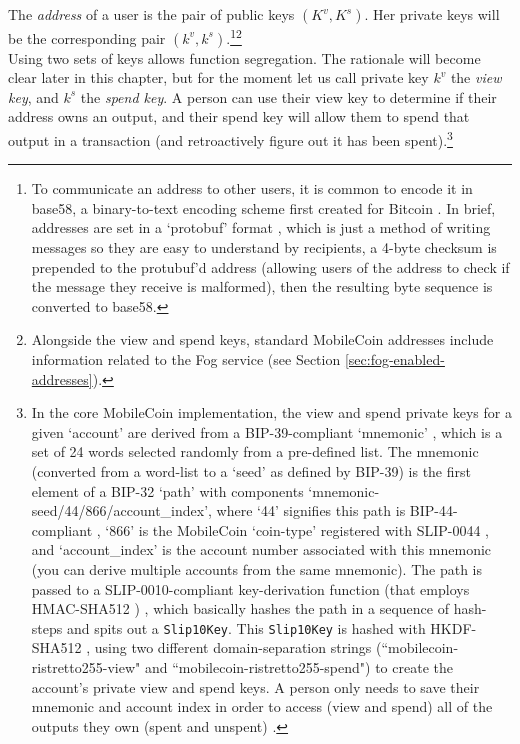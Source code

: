 The {\em address} of a user is the pair of public keys \((K^v, K^s)\). Her private keys will be the corresponding pair \( (k^v, k^s) \).\footnote{To communicate an address to other users, it is common to encode it in base58, a binary-to-text encoding scheme first created for Bitcoin \cite{base-58-encoding}. In brief, addresses are set in a `protobuf' format \cite{protubuf-encoding}, which is just a method of writing messages so they are easy to understand by recipients, a 4-byte checksum is prepended to the protubuf'd address (allowing users of the address to check if the message they receive is malformed), then the resulting byte sequence is converted to base58.}\footnote{Alongside the view and spend keys, standard MobileCoin addresses include information related to the Fog service (see Section \ref{sec:fog-enabled-addresses}).}
\\

Using two sets of keys allows function segregation. The rationale will become clear later in this chapter, but for the moment let us call private key $k^v$ the {\em view key}, and $k^s$ the {\em spend key}. A person can use their view key to determine if their address owns an output, and their spend key will allow them to spend that output in a transaction (and retroactively figure out it has been spent).\footnote{In the core MobileCoin implementation, the view and spend private keys for a given `account' are derived from a BIP-39-compliant `mnemonic' \cite{bip-39}, which is a set of 24 words selected randomly from a pre-defined list. The mnemonic (converted from a word-list to a `seed' \cite{tiny-bip39-lib} as defined by BIP-39) is the first element of a BIP-32 `path' \cite{bip-32} with components `mnemonic-seed/44/866/account\_index', where `44' signifies this path is BIP-44-compliant \cite{bip-44}, `866' is the MobileCoin `coin-type' registered with SLIP-0044 \cite{slip-44}, and `account\_index' is the account number associated with this mnemonic (you can derive multiple accounts from the same mnemonic). The path is passed to a SLIP-0010-compliant \cite{slip-10} key-derivation function (that employs HMAC-SHA512 \cite{hmac-rfc2104}) \cite{slip10-ed25519-lib}, which basically hashes the path in a sequence of hash-steps and spits out a {\tt Slip10Key}. This {\tt Slip10Key} is hashed with HKDF-SHA512 \cite{kdfs-rust-lib, hkdf-rfc5869}, using two different domain-separation strings (``mobilecoin-ristretto255-view" and ``mobilecoin-ristretto255-spend") to create the account's private view and spend keys. A person only needs to save their mnemonic and account index in order to access (view and spend) all of the outputs they own (spent and unspent) \cite{mobilecoin-migration-to-mnemonics}.}



